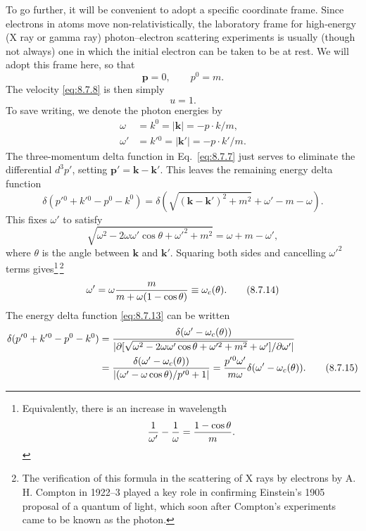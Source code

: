 To go further, it will be convenient to adopt a specific coordinate frame.
Since electrons in atoms move non-relativistically, the laboratory frame for
high-energy (X ray or gamma ray) photon--electron scattering experiments is
usually (though not always) one in which the initial electron can be taken to
be at rest. We will adopt this frame here, so that
\begin{equation}
\mathbf p=0,\qquad p^0=m.
\tag{8.7.9}\label{eq:8.7.9}
\end{equation}
The velocity \eqref{eq:8.7.8} is then simply
\begin{equation}
u=1.
\tag{8.7.10}\label{eq:8.7.10}
\end{equation}
To save writing, we denote the photon energies by
\begin{align}
\omega&=k^0=|\mathbf k|=-p\cdot k/m,
\tag{8.7.11}\label{eq:8.7.11}\\
\omega'&=k'{}^0=|\mathbf k'|=-p\cdot k'/m.
\tag{8.7.12}\label{eq:8.7.12}
\end{align}
The three-momentum delta function in Eq.~\eqref{eq:8.7.7} just serves to eliminate
the differential $d^3p'$, setting $\mathbf p'=\mathbf k-\mathbf k'$. This
leaves the remaining energy delta function
\begin{equation}
\delta(p'{}^0+k'{}^0-p^0-k^0)
=\delta\!\left(\sqrt{(\mathbf k-\mathbf k')^2+m^2}+\omega'-m-\omega\right).
\tag{8.7.13}\label{eq:8.7.13}
\end{equation}
This fixes $\omega'$ to satisfy
\[
\sqrt{\omega^2-2\omega\omega'\cos\theta+\omega'^2+m^2}
=\omega+m-\omega',
\]
where $\theta$ is the angle between $\mathbf k$ and $\mathbf k'$. Squaring
both sides and cancelling $\omega'^2$ terms gives\footnote{Equivalently,
there is an increase in wavelength
\[
{1\over\omega'}-{1\over\omega}={1-\cos\theta\over m}.
\]}\,\footnote{The verification of this formula in the scattering of X rays by
electrons by A. H. Compton in 1922--3 played a key role in confirming
Einstein's 1905 proposal of a quantum of light, which soon after Compton's
experiments came to be known as the photon.}
\begin{equation}
\omega'=\omega{m\over m+\omega(1-\cos\theta)}\equiv\omega_c(\theta).
\tag{8.7.14}\label{eq:8.7.14}
\end{equation}
The energy delta function \eqref{eq:8.7.13} can be written
\begin{align}
\delta(p'{}^0+k'{}^0-p^0-k^0)
&={\delta(\omega'-\omega_c(\theta))\over
 |\partial[\sqrt{\omega^2-2\omega\omega'\cos\theta+\omega'^2+m^2}
        +\omega']/\partial\omega'|}
\notag\\
&={\delta(\omega'-\omega_c(\theta))\over
 |(\omega'-\omega\cos\theta)/p'{}^0+1|}
={p'{}^0\omega'\over m\omega}\delta(\omega'-\omega_c(\theta)).
\tag{8.7.15}\label{eq:8.7.15}
\end{align}
